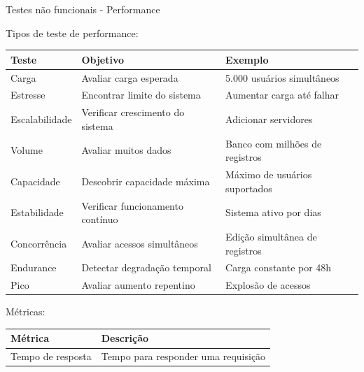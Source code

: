 \begin{frame}{Testes não funcionais - Performance}

Tipos de teste de performance:

\begin{table}[H]
\tiny
\begin{tabular}{|p{1.8cm}|p{4cm}|p{4cm}|}
\hline
\textbf{Teste} & \textbf{Objetivo} & \textbf{Exemplo} \\
\hline

Carga & Avaliar carga esperada & 5.000 usuários simultâneos \\
\hline

Estresse & Encontrar limite do sistema & Aumentar carga até falhar \\
\hline

Escalabilidade & Verificar crescimento do sistema & Adicionar servidores \\
\hline

Volume & Avaliar muitos dados & Banco com milhões de registros \\
\hline

Capacidade & Descobrir capacidade máxima & Máximo de usuários suportados \\
\hline

Estabilidade & Verificar funcionamento contínuo & Sistema ativo por dias \\
\hline

Concorrência & Avaliar acessos simultâneos & Edição simultânea de registros \\
\hline

Endurance & Detectar degradação temporal & Carga constante por 48h \\
\hline

Pico & Avaliar aumento repentino & Explosão de acessos \\
\hline

\end{tabular}
\end{table}

\vspace{0.2cm}

Métricas:

\begin{table}[H]
\tiny
\renewcommand{\arraystretch}{1.1}

\begin{tabular}{|p{4.0cm}|p{4.5cm}|}
\hline
\textbf{Métrica} & \textbf{Descrição} \\
\hline

Tempo de resposta &
Tempo para responder uma requisição \\
\hline


\end{tabular}
\end{table}
\end{frame}
